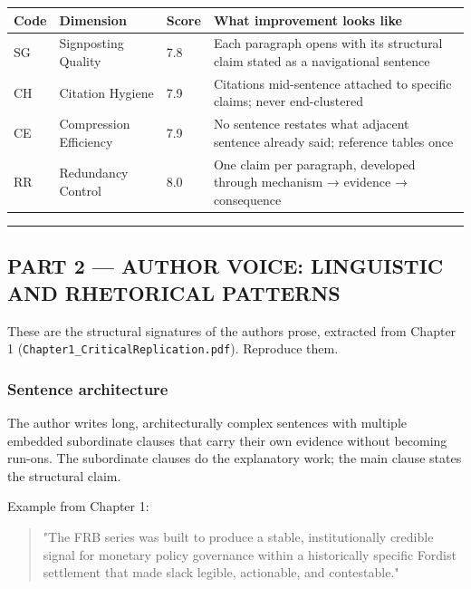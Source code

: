 \begin{longtable}[]{@{}llll@{}}
\toprule\noalign{}
Code & Dimension & Score & What improvement looks like \\
\midrule\noalign{}
\endhead
\bottomrule\noalign{}
\endlastfoot
SG & Signposting Quality & 7.8 & Each paragraph opens with its
structural claim stated as a navigational sentence \\
CH & Citation Hygiene & 7.9 & Citations mid-sentence attached to
specific claims; never end-clustered \\
CE & Compression Efficiency & 7.9 & No sentence restates what adjacent
sentence already said; reference tables once \\
RR & Redundancy Control & 8.0 & One claim per paragraph, developed
through mechanism → evidence → consequence \\
\end{longtable}

\begin{center}\rule{0.5\linewidth}{0.5pt}\end{center}

\subsection{PART 2 --- AUTHOR VOICE: LINGUISTIC AND RHETORICAL
PATTERNS}\label{part-2--author-voice-linguistic-and-rhetorical-patterns}

These are the structural signatures of the author\textquotesingle s
prose, extracted from Chapter 1
(\texttt{Chapter1\_CriticalReplication.pdf}). Reproduce them.

\subsubsection{Sentence architecture}\label{sentence-architecture}

The author writes long, architecturally complex sentences with multiple
embedded subordinate clauses that carry their own evidence without
becoming run-ons. The subordinate clauses do the explanatory work; the
main clause states the structural claim.

Example from Chapter 1:

\begin{quote}
"The FRB series was built to produce a stable, institutionally credible
signal for monetary policy governance within a historically specific
Fordist settlement that made slack legible, actionable, and
contestable."
\end{quote}

